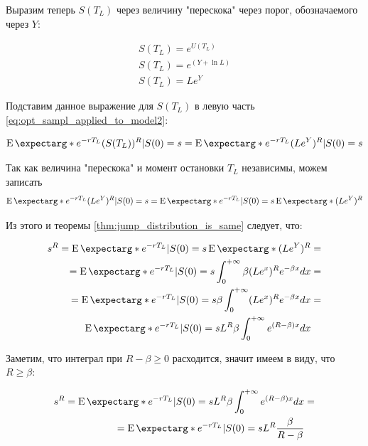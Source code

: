 \documentclass[a4paper,12pt]{article}
\theoremstyle{definition}
\newcommand{\expect}{\operatorname{E}\expectarg}
\begin{document}
Выразим теперь $S(T_L)$ через величину "перескока" через порог, обозначаемого через $Y$:

\begin{gather*}
    S(T_L) = e^{U(T_L)} \\
    S(T_L) = e^{(Y + \ln L)} \\
    S(T_L) = L e^Y
\end{gather*}

Подставим данное выражение для $S(T_L)$ в левую часть \eqref{eq:opt_sampl_applied_to_model2}:

\begin{equation*}
    \expect*{e^{-rT_L} (S(T_L))^{R} | S(0) = s} = \expect*{e^{-rT_L} (L e^Y)^{R} | S(0) = s}
\end{equation*}

Так как величина "перескока" и момент остановки $T_L$ независимы, можем записать 
\begin{equation*}
    \expect*{e^{-rT_L} (L e^Y)^{R} | S(0) = s} = \expect*{e^{-rT_L} | S(0) = s} \expect*{(L e^Y)^{R}}
\end{equation*}

Из этого и теоремы \ref{thm:jump_distribution_is_same} следует, что:

\begin{equation*}
\begin{split}
    s^{R} = \expect*{e^{-rT_L} | S(0) = s} \expect*{(L e^Y)^{R}} &= \\
    = \expect*{e^{-rT_L} | S(0) = s} \int_{0}^{+\infty} \beta (L e^{x})^{R} e^{-\beta x} dx &= \\
    = \expect*{e^{-rT_L} | S(0) = s} \beta \int_{0}^{+\infty} (L e^{x})^{R} e^{-\beta x} dx &= \\
    \expect*{e^{-rT_L} | S(0) = s} L^{R} \beta \int_{0}^{+\infty} e^{(R - \beta) x} dx
\end{split}
\end{equation*}

Заметим, что интеграл при $R - \beta \ge 0$ расходится, значит имеем в виду, что $R \ge \beta$:

\begin{equation}\label{eq:same_distr_conseq}
\begin{split}
    s^{R} = \expect*{e^{-rT_L} | S(0) = s} L^{R} \beta \int_{0}^{+\infty} e^{(R - \beta) x} dx &= \\
    = \expect*{e^{-rT_L} | S(0) = s} L^{R} \frac {\beta} {R - \beta}
\end{split}
\end{equation}
\end{document}
